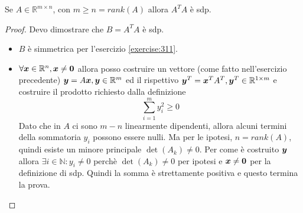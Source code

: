 \begin{exercise}[3.12]
Se $A \in \mathbb{R}^{m \times n}$, con $m \geq n = rank(A)$ allora $A^{T}A$ \`e
sdp.
\end{exercise}
\begin{proof}
Devo dimostrare che $B = A^{T}A$ \`e sdp.
\begin{itemize}
  \item $B$ \`e simmetrica per l'esercizio \ref{exercise:311}.
  \item $\forall \boldsymbol{x} \in \mathbb{R}^{n}, \boldsymbol{x} \not = \boldsymbol{0}$ allora
  posso costruire un vettore (come fatto nell'esercizio precedente) $\boldsymbol{y} =
  A\boldsymbol{x}, \boldsymbol{y} \in \mathbb{R}^{m}$ ed il rispettivo $\boldsymbol{y}^{T} = 
  \boldsymbol{x}^{T}A^{T}, \boldsymbol{y}^{T} \in \mathbb{R}^{1 \times m}$ e costruire il 
  prodotto richiesto dalla definizione
  \begin{displaymath}
  	\sum_{i = 1}^{m}{y_{i}^{2}} \geq 0
  \end{displaymath}
  Dato che in $A$ ci sono $m-n$ linearmente dipendenti, allora alcuni termini
  della sommatoria $y_{i}$ possono essere nulli. Ma per le ipotesi, $n =
  rank(A)$, quindi esiste un minore principale $\det(A_{k}) \not = 0$. Per come
  \`e costruito $\boldsymbol{y}$ allora $\exists i \in \mathbb{N}: y_{i} \not = 0$
  perch\`e $\det(A_{k}) \not = 0$ per ipotesi e $\boldsymbol{x} \not = \boldsymbol{0}$ per
  la definizione di sdp. Quindi la somma \`e strettamente positiva e questo
  termina la prova.
\end{itemize}
\end{proof}

